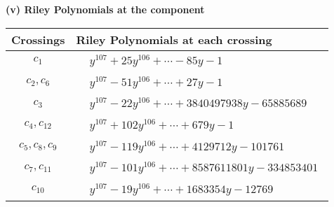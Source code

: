 \documentclass[1p]{elsarticle_modified}
\theoremstyle{definition}
\begin{document}
\flushleft \textbf{(v) Riley Polynomials at the component}\newline \\
\begin{tabular}{m{50pt}|m{274pt}}
Crossings & \hspace{64pt}Riley Polynomials at each crossing \\
\hline $$\begin{aligned}c_{1}\end{aligned}$$&$\begin{aligned}
&y^{107}+25 y^{106}+\cdots-85 y-1
\end{aligned}$\\
\hline $$\begin{aligned}c_{2},c_{6}\end{aligned}$$&$\begin{aligned}
&y^{107}-51 y^{106}+\cdots+27 y-1
\end{aligned}$\\
\hline $$\begin{aligned}c_{3}\end{aligned}$$&$\begin{aligned}
&y^{107}-22 y^{106}+\cdots+3840497938 y-65885689
\end{aligned}$\\
\hline $$\begin{aligned}c_{4},c_{12}\end{aligned}$$&$\begin{aligned}
&y^{107}+102 y^{106}+\cdots+679 y-1
\end{aligned}$\\
\hline $$\begin{aligned}c_{5},c_{8},c_{9}\end{aligned}$$&$\begin{aligned}
&y^{107}-119 y^{106}+\cdots+4129712 y-101761
\end{aligned}$\\
\hline $$\begin{aligned}c_{7},c_{11}\end{aligned}$$&$\begin{aligned}
&y^{107}-101 y^{106}+\cdots+8587611801 y-334853401
\end{aligned}$\\
\hline $$\begin{aligned}c_{10}\end{aligned}$$&$\begin{aligned}
&y^{107}-19 y^{106}+\cdots+1683354 y-12769
\end{aligned}$\\
\hline
\end{tabular}\\~\\
\end{document}
